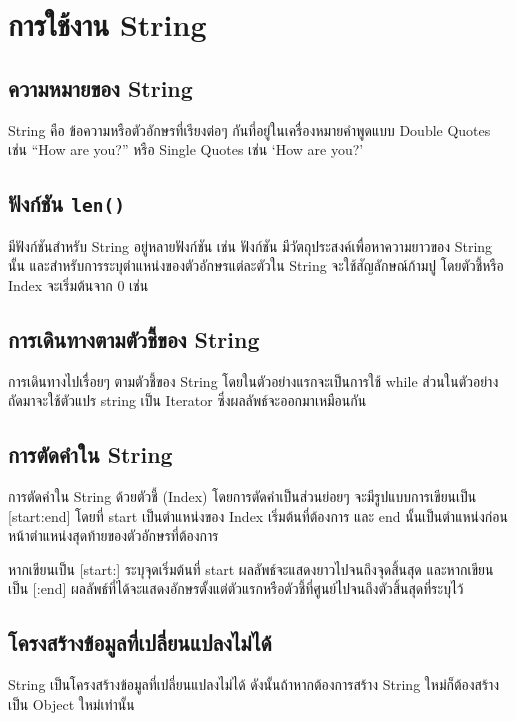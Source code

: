 \chapter{การใช้งาน String}
\section{ความหมายของ String}

String คือ ข้อความหรือตัวอักษรที่เรียงต่อๆ กันที่อยู่ในเครื่องหมายคำพูดแบบ Double Quotes เช่น “How are you?” หรือ Single Quotes เช่น ‘How are you?’ 

\section{ฟังก์ชัน \texttt{len()}}

มีฟังก์ชันสำหรับ String อยู่หลายฟังก์ชัน เช่น ฟังก์ชัน  มีวัตถุประสงค์เพื่อหาความยาวของ String นั้น และสำหรับการระบุตำแหน่งของตัวอักษรแต่ละตัวใน String จะใช้สัญลักษณ์ก้ามปู \pyinline{[ ]} โดยตัวชี้หรือ Index จะเริ่มต้นจาก 0 เช่น 

\section{การเดินทางตามตัวชี้ของ String}

การเดินทางไปเรื่อยๆ ตามตัวชี้ของ String โดยในตัวอย่างแรกจะเป็นการใช้ while ส่วนในตัวอย่างถัดมาจะใช้ตัวแปร string เป็น Iterator ซึ่งผลลัพธ์จะออกมาเหมือนกัน


\section{การตัดคำใน String}

การตัดคำใน String ด้วยตัวชี้ (Index) โดยการตัดคำเป็นส่วนย่อยๆ จะมีรูปแบบการเขียนเป็น [start:end] โดยที่ start เป็นตำแหน่งของ Index เริ่มต้นที่ต้องการ และ end นั้นเป็นตำแหน่งก่อนหน้าตำแหน่งสุดท้ายของตัวอักษรที่ต้องการ 

หากเขียนเป็น [start:] ระบุจุดเริ่มต้นที่ start ผลลัพธ์จะแสดงยาวไปจนถึงจุดสิ้นสุด และหากเขียนเป็น [:end] ผลลัพธ์ที่ได้จะแสดงอักษรตั้งแต่ตัวแรกหรือตัวชี้ที่ศูนย์ไปจนถึงตัวสิ้นสุดที่ระบุไว้

\section{โครงสร้างข้อมูลที่เปลี่ยนแปลงไม่ได้}

String เป็นโครงสร้างข้อมูลที่เปลี่ยนแปลงไม่ได้ ดังนั้นถ้าหากต้องการสร้าง String ใหม่ก็ต้องสร้างเป็น Object ใหม่เท่านั้น

